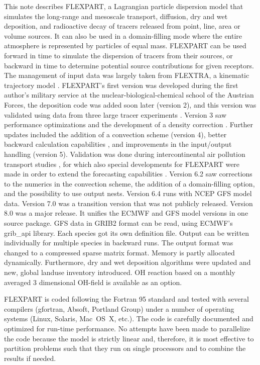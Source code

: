 \documentclass{egu}            %
\begin{document}
This note describes FLEXPART, a Lagrangian particle dispersion model that
simulates the long-range and mesoscale transport, diffusion, dry and wet
deposition, and radioactive decay of tracers released from point, line, area or
volume sources.  It can also be used in a domain-filling mode where the entire
atmosphere is represented by particles of equal mass.  FLEXPART can be used
forward in time to simulate the dispersion of tracers from their sources, or
backward in time to determine potential source contributions for given
receptors.  The management of input data was largely taken from FLEXTRA, a
kinematic trajectory model \citep{stohl1995}.  FLEXPART's first version was
developed during the first author's military service at the
nuclear-biological-chemical school of the Austrian Forces, the deposition code
was added soon later (version 2), and this version was validated using data
from three large tracer experiments \citep{stohletal1998}.  Version 3 saw
performance optimizations and the development of a density correction
\citep{stohlthomson1999}.  Further updates included the addition of a
convection scheme \citep{seibertetal2001} (version 4), better backward
calculation capabilities \citep{seibert2004}, and improvements in the
input/output handling (version 5).  Validation was done during intercontinental
air pollution transport studies \citep{stohl1999, forster2001, spichtinger2001,
stohl2002, stohl2003}, for which also special developments for FLEXPART were
made in order to extend the forecasting capabilities \citep{stohl2004}.
Version 6.2 saw corrections to the numerics in the convection scheme, the
addition of a domain-filling option, and the possibility to use output nests.
Version 6.4 runs with NCEP GFS model data.  Version 7.0 was a transition
version that was not publicly released.  Version 8.0 was a major release.  It
unifies the ECMWF and GFS model versions in one source package. GFS data in
GRIB2 format can be read, using ECMWF's grib\_api library. Each species
got its own definition file.  Output can be written individually for multiple
species in backward runs.  The output format was changed to a compressed sparse
matrix format.  Memory is partly allocated dynamically.  Furthermore, dry and
wet deposition algorithms were updated and new, global landuse inventory
introduced.  OH reaction based on a monthly averaged 3 dimensional OH-field is
available as an option.

FLEXPART is coded following the Fortran 95 standard and tested with several
compilers (gfortran, Absoft, Portland Group) under a number of operating
systems (Linux, Solaris, Mac~OS~X, etc.).  The code is carefully documented and
optimized for run-time performance.  No attempts have been made to parallelize
the code because the model is strictly linear and, therefore, it is most
effective to partition problems such that they run on single processors and to
combine the results if needed.
\end{document}
